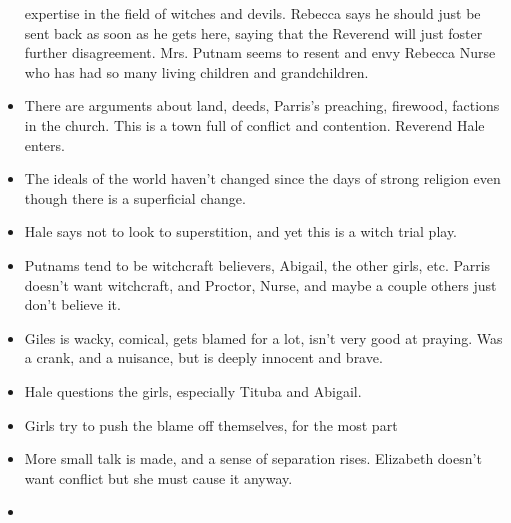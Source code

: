 \documentclass[10pt]{article}
\begin{document}
\begin{itemize}
		expertise in the field of witches and devils.  Rebecca says he
		should just be sent back as soon as he gets here, saying that the
		Reverend will just foster further disagreement.  Mrs. Putnam seems
		to resent and envy Rebecca Nurse who has had so many living children
		and grandchildren.
	\item There are arguments about land, deeds, Parris's preaching,
		firewood, factions in the church.  This is a town full of conflict
		and contention.  Reverend Hale enters.
	\item The ideals of the world haven't changed since the days of strong
		religion even though there is a superficial change.
	\item Hale says not to look to superstition, and yet this is a witch
		trial play.
	\item Putnams tend to be witchcraft believers, Abigail, the other girls,
		etc.  Parris doesn't want witchcraft, and Proctor, Nurse, and maybe
		a couple others just don't believe it.
	\item Giles is wacky, comical, gets blamed for a lot, isn't very good
		at praying.  Was a crank, and a nuisance, but is deeply innocent and
		brave.
	\item Hale questions the girls, especially Tituba and Abigail.  
	\item Girls try to push the blame off themselves, for the most part
	\item More small talk is made, and a sense of separation rises.  
		Elizabeth doesn't want conflict but she must cause it anyway.
	\item 
\end{itemize}
\end{document}
